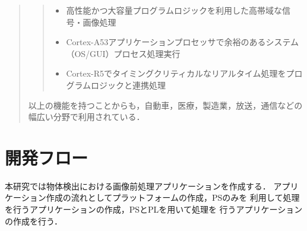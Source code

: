 \documentclass[11pt,a4j]{jreport}
\begin{document}
\begin{quote}
\begin{itemize}
    \begin{quote}
      \begin{itemize}
        \item 高性能かつ大容量プログラムロジックを利用した高帯域な信号・画像処理
        \item Cortex-A53アプリケーションプロセッサで余裕のあるシステム（OS/GUI）プロセス処理実行
        \item Cortex-R5でタイミングクリティカルなリアルタイム処理をプログラムロジックと連携処理
      \end{itemize}
    \end{quote}
    以上の機能を持つことからも，自動車，医療，製造業，放送，通信などの幅広い分野で利用されている．
  \end{itemize}
\end{quote}
\section{開発フロー}
本研究では物体検出における画像前処理アプリケーションを作成する．
アプリケーション作成の流れとしてプラットフォームの作成，PSのみを
利用して処理を行うアプリケーションの作成，PSとPLを用いて処理を
行うアプリケーションの作成を行う．
\end{document}
